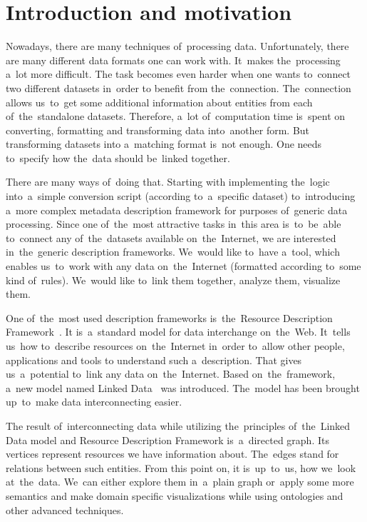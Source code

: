 \chapter*{Introduction and motivation}
\label{ch:preface}
Nowadays, there are many techniques of~processing data. Unfortunately, there are many
different data formats one can work with. It~makes the~processing a~lot more difficult.
The task becomes even harder when one wants to~connect two different datasets in~order to
benefit from the~connection. The~connection allows us~to~get some additional information
about entities from each of~the~standalone datasets. Therefore, a~lot of~computation time is~spent
on converting, formatting and transforming data into~another form. But transforming datasets
into a~matching format is~not enough. One needs to~specify how the~data should be~linked
together.

There are many ways of~doing that. Starting with implementing the~logic into~a~simple conversion
script (according to~a~specific dataset) to~introducing a~more complex metadata description
framework for purposes of~generic data processing. Since one of~the~most attractive
tasks in~this area is~to~be~able to~connect any of~the~datasets available on~the~Internet,
we are interested in~the~generic description frameworks. We~would like to~have 
a~tool, 
which enables us~to~work with any data on~the~Internet (formatted according to~some
kind of~rules). We~would like to~link them together, analyze them, visualize 
them.

One of~the~most used description frameworks is~the~Resource Description Framework~\cite{rdf}.
It is~a~standard model for data interchange on~the~Web. It~tells us~how to~describe
resources on~the~Internet in~order to~allow other people, applications and tools
to understand such a~description. That gives us~a~potential to~link any data on~the~Internet.
Based on~the~framework, a~new model named Linked Data~\cite{ld} was introduced. The~model
has been brought up~to~make data interconnecting easier.

The result of~interconnecting data while utilizing the~principles of~the~Linked Data model
and Resource Description Framework is~a~directed graph. Its vertices represent resources we
have information about. The~edges stand for relations between such entities. From this point on,
it is~up~to~us, how we~look at~the~data. We~can either explore them in~a~plain graph or~apply
some more semantics and make domain specific visualizations while using ontologies
and other advanced techniques.

